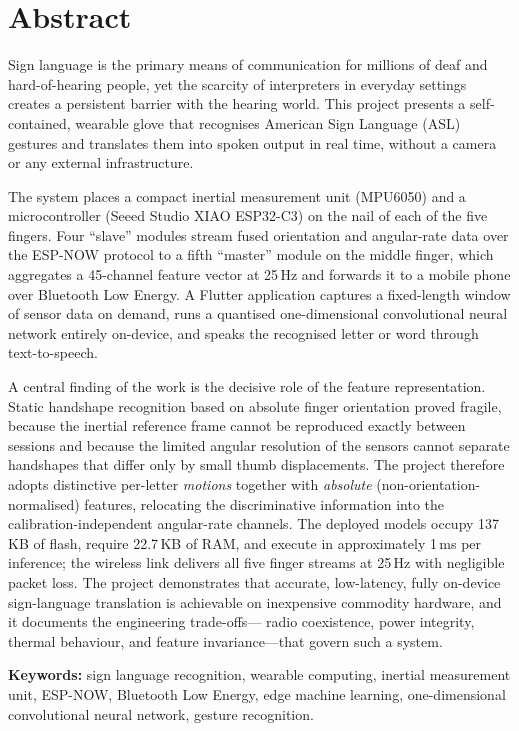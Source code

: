 \chapter*{Abstract}

Sign language is the primary means of communication for millions of deaf and
hard-of-hearing people, yet the scarcity of interpreters in everyday settings
creates a persistent barrier with the hearing world. This project presents a
self-contained, wearable glove that recognises American Sign Language (ASL)
gestures and translates them into spoken output in real time, without a camera
or any external infrastructure.

The system places a compact inertial measurement unit (MPU6050) and a
microcontroller (Seeed Studio XIAO ESP32-C3) on the nail of each of the five
fingers. Four ``slave'' modules stream fused orientation and angular-rate data
over the ESP-NOW protocol to a fifth ``master'' module on the middle finger,
which aggregates a 45-channel feature vector at 25\,Hz and forwards it to a
mobile phone over Bluetooth Low Energy. A Flutter application captures a
fixed-length window of sensor data on demand, runs a quantised one-dimensional
convolutional neural network entirely on-device, and speaks the recognised
letter or word through text-to-speech.

A central finding of the work is the decisive role of the feature
representation. Static handshape recognition based on absolute finger
orientation proved fragile, because the inertial reference frame cannot be
reproduced exactly between sessions and because the limited angular resolution
of the sensors cannot separate handshapes that differ only by small thumb
displacements. The project therefore adopts distinctive per-letter
\emph{motions} together with \emph{absolute} (non-orientation-normalised)
features, relocating the discriminative information into the
calibration-independent angular-rate channels. The deployed models occupy
137\,KB of flash, require 22.7\,KB of RAM, and execute in approximately 1\,ms
per inference; the wireless link delivers all five finger streams at 25\,Hz
with negligible packet loss. The project demonstrates that accurate,
low-latency, fully on-device sign-language translation is achievable on
inexpensive commodity hardware, and it documents the engineering trade-offs—%
radio coexistence, power integrity, thermal behaviour, and feature
invariance—that govern such a system.

\vfill
\textbf{Keywords:} sign language recognition, wearable computing, inertial
measurement unit, ESP-NOW, Bluetooth Low Energy, edge machine learning,
one-dimensional convolutional neural network, gesture recognition.
\clearpage
